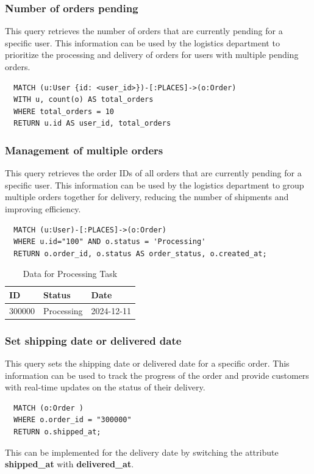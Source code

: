 \documentclass[a4paper,12pt]{article}
\begin{document}
\subsubsection{Number of orders pending}
This query retrieves the number of orders that are currently pending for a specific user. This information can be used by the logistics department to prioritize the processing and delivery of orders for users with multiple pending orders.
\begin{verbatim}
  MATCH (u:User {id: <user_id>})-[:PLACES]->(o:Order)
  WITH u, count(o) AS total_orders
  WHERE total_orders = 10
  RETURN u.id AS user_id, total_orders
\end{verbatim}

\subsubsection{Management of multiple orders}
This query retrieves the order IDs of all orders that are currently pending for a specific user. This information can be used by the logistics department to group multiple orders together for delivery, reducing the number of shipments and improving efficiency.
\begin{verbatim}
  MATCH (u:User)-[:PLACES]->(o:Order)
  WHERE u.id="100" AND o.status = 'Processing'  
  RETURN o.order_id, o.status AS order_status, o.created_at;

\end{verbatim}
  \begin{table}[h!]
    \centering
    \caption{Data for Processing Task}
    \label{tab:processing_data}
    \begin{tabular}{l l l}
        \toprule
        \textbf{ID} & \textbf{Status} & \textbf{Date} \\
        \midrule
        300000 & Processing & 2024-12-11 \\
        \bottomrule
    \end{tabular}
\end{table}

\subsubsection{Set shipping date or delivered date}
This query sets the shipping date or delivered date for a specific order. This information can be used to track the progress of the order and provide customers with real-time updates on the status of their delivery.
\begin{verbatim}
  MATCH (o:Order ) 
  WHERE o.order_id = "300000"
  RETURN o.shipped_at;
\end{verbatim}
This can be implemented for the delivery date by switching the attribute \textbf{shipped\_at} with \textbf{delivered\_at}.
\end{document}
